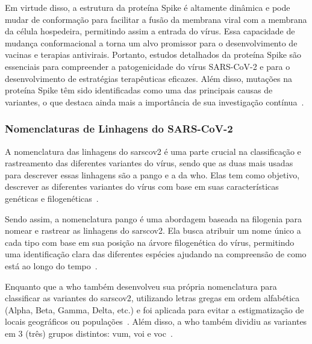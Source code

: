 Em virtude disso, a estrutura da proteína Spike é altamente dinâmica e pode mudar de conformação para facilitar a fusão da membrana viral com a membrana da célula hospedeira, permitindo assim a entrada do vírus. Essa capacidade de mudança conformacional a torna um alvo promissor para o desenvolvimento de vacinas e terapias antivirais. Portanto, estudos detalhados da proteína Spike são essenciais para compreender a patogenicidade do vírus SARS-CoV-2 e para o desenvolvimento de estratégias terapêuticas eficazes. Além disso, mutações na proteína Spike têm sido identificadas como uma das principais causas de variantes, o que destaca ainda mais a importância de sua investigação contínua~\cite{covid19_cascella_2020}.

\subsubsection{Nomenclaturas de Linhagens do SARS-CoV-2}
A nomenclatura das linhagens do \gls{sarscov2} é uma parte crucial na classificação e rastreamento das diferentes variantes do vírus, sendo que as duas mais usadas para descrever essas linhagens são a \gls{pango} e a da \gls{who}. Elas tem como objetivo, descrever as diferentes variantes do vírus com base em suas características genéticas e filogenéticas~\cite{pango_rambaut_2020,who_variants}.

Sendo assim, a nomenclatura \gls{pango} é uma abordagem baseada na filogenia para nomear e rastrear as linhagens do \gls{sarscov2}. Ela busca atribuir um nome único a cada tipo com base em sua posição na árvore filogenética do vírus, permitindo uma identificação clara das diferentes espécies ajudando na compreensão de como está ao longo do tempo~\cite{pango_rambaut_2020}.

Enquanto que a \gls{who} também desenvolveu sua própria nomenclatura para classificar as variantes do \gls{sarscov2}, utilizando letras gregas em ordem alfabética (Alpha, Beta, Gamma, Delta, etc.) e foi aplicada para evitar a estigmatização de locais geográficos ou populações~\cite{who_variants,covid_current_chenchula_2022,covid_raman_2021}. Além disso, a \gls{who} também dividiu as variantes em 3 (três) grupos distintos: \gls{vum}, \gls{voi} e \gls{voc}~\cite{covid19_cascella_2020,covid_raman_2021}.

